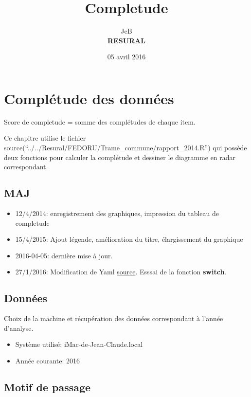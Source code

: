 \documentclass[]{article}
\title{Completude}
\author{JcB \\ \textbf{RESURAL}}
\date{05 avril 2016}
\providecommand{\tightlist}{%
  \setlength{\itemsep}{0pt}\setlength{\parskip}{0pt}}
\begin{document}
\maketitle

{
\setcounter{tocdepth}{2}
\tableofcontents
}
\section{Complétude des données}\label{completude-des-donnees}

Score de completude = somme des complétudes de chaque item.

Ce chapitre utilise le fichier
source(``../../Resural/FEDORU/Trame\_commune/rapport\_2014.R'') qui
possède deux fonctions pour calculer la complétude et dessiner le
diagramme en radar correspondant.

\subsection{MAJ}\label{maj}

\begin{itemize}
\tightlist
\item
  12/4/2014: enregistrement des graphiques, impression du tableau de
  completude
\item
  15/4/2015: Ajout légende, amélioration du titre, élargissement du
  graphique
\item
  2016-04-05: dernière mise à jour.
\item
  27/1/2016: Modification de Yaml \href{}{source}. Esssai de la fonction
  \textbf{switch}.
\end{itemize}

\subsection{Données}\label{donnees}

Choix de la machine et récupération des données correspondant à l'année
d'analyse.

\begin{itemize}
\tightlist
\item
  Système utilisé: iMac-de-Jean-Claude.local
\item
  Année courante: 2016
\end{itemize}

\subsection{Motif de passage}\label{motif-de-passage}
\end{document}
